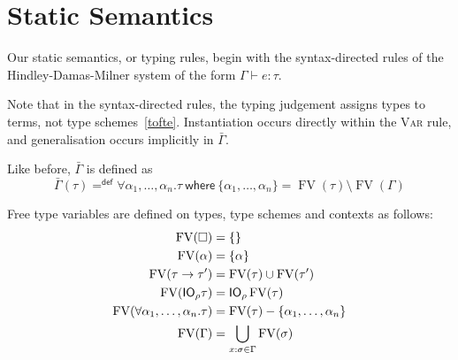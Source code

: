 \section{Static Semantics}

Our static semantics, or typing rules, begin with the syntax-directed
rules of the Hindley-Damas-Milner system of the form $\Gamma \vdash e : \tau$.


Note that in the syntax-directed rules, the typing judgement assigns
types to terms, not type schemes~\ref{tofte}. Instantiation occurs
directly within the \textsc{Var} rule, and generalisation occurs
implicitly in $\bar{\Gamma}$.

\newcommand{\fv}{\operatorname{FV}}

Like before, $\bar{\Gamma}$ is defined as
$$ \bar{\Gamma}(\tau) =^{\textsf{def}} \forall \alpha_1, \ldots, \alpha_n . \tau \
\textsf{where} \ \{ \alpha_1, \ldots, \alpha_n \} = \fv(\tau) \setminus \fv(\Gamma)$$

Free type variables are defined on types, type schemes and contexts as
follows:
\begin{align*}
  \fv(\square) &= \{ \} \\
  \fv(\alpha) &= \{ \alpha \} \\
  \fv(\tau \rightarrow \tau') &= \fv(\tau) \cup \fv(\tau') \\
  \fv(\IO_\rho \tau) &= \IO_\rho \fv(\tau) \\
  \fv(\forall \alpha_1 , \ldots , \alpha_n . \tau) &= \fv(\tau) - \{ \alpha_1 , \ldots, \alpha_n \} \\
  \fv(\Gamma) &= \bigcup_{x : \sigma \in \Gamma} \fv(\sigma)
\end{align*}
  

